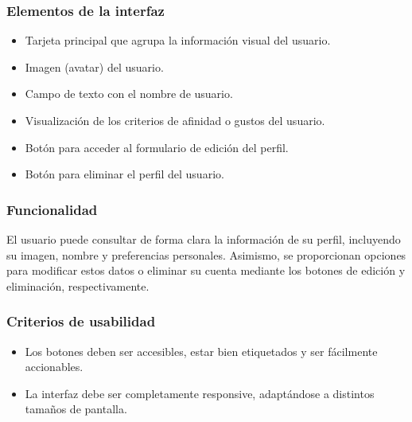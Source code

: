 \subsubsection{Elementos de la interfaz}
\begin{itemize}
  \item Tarjeta principal que agrupa la información visual del usuario.
  \item Imagen (avatar) del usuario.
  \item Campo de texto con el nombre de usuario.
  \item Visualización de los criterios de afinidad o gustos del usuario.
  \item Botón para acceder al formulario de edición del perfil.
  \item Botón para eliminar el perfil del usuario.
\end{itemize}

\subsubsection{Funcionalidad}
El usuario puede consultar de forma clara la información de su perfil, incluyendo su imagen, nombre y preferencias personales. Asimismo, se proporcionan opciones para modificar estos datos o eliminar su cuenta mediante los botones de edición y eliminación, respectivamente.

\subsubsection{Criterios de usabilidad}
\begin{itemize}
  \item Los botones deben ser accesibles, estar bien etiquetados y ser fácilmente accionables.
  \item La interfaz debe ser completamente responsive, adaptándose a distintos tamaños de pantalla.

\end{itemize}

